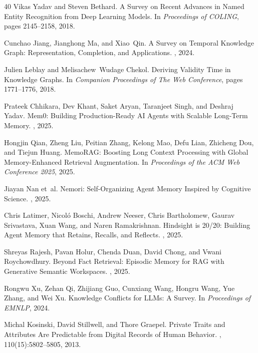 \documentclass[manuscript,review]{acmart}
\begin{document}
\begin{thebibliography}{40}
Vikas Yadav and Steven Bethard.
\newblock A Survey on Recent Advances in Named Entity Recognition from Deep Learning Models.
\newblock In {\em Proceedings of COLING}, pages 2145--2158, 2018.

Cunchao Jiang, Jianghong Ma, and Xiao~Qin.
\newblock A Survey on Temporal Knowledge Graph: Representation, Completion, and Applications.
, 2024.

Julien Leblay and Melisachew~Wudage Chekol.
\newblock Deriving Validity Time in Knowledge Graphs.
\newblock In {\em Companion Proceedings of The Web Conference}, pages 1771--1776, 2018.

Prateek Chhikara, Dev Khant, Saket Aryan, Taranjeet Singh, and Deshraj Yadav.
\newblock Mem0: Building Production-Ready AI Agents with Scalable Long-Term Memory.
, 2025.

Hongjin Qian, Zheng Liu, Peitian Zhang, Kelong Mao, Defu Lian, Zhicheng Dou, and Tiejun Huang.
\newblock MemoRAG: Boosting Long Context Processing with Global Memory-Enhanced Retrieval Augmentation.
\newblock In {\em Proceedings of the ACM Web Conference 2025}, 2025.

Jiayan Nan et~al.
\newblock Nemori: Self-Organizing Agent Memory Inspired by Cognitive Science.
, 2025.

Chris Latimer, Nicol{\'o} Boschi, Andrew Neeser, Chris Bartholomew, Gaurav Srivastava, Xuan Wang, and Naren Ramakrishnan.
\newblock Hindsight is 20/20: Building Agent Memory that Retains, Recalls, and Reflects.
, 2025.

Shreyas Rajesh, Pavan Holur, Chenda Duan, David Chong, and Vwani Roychowdhury.
\newblock Beyond Fact Retrieval: Episodic Memory for RAG with Generative Semantic Workspaces.
, 2025.

Rongwu Xu, Zehan Qi, Zhijiang Guo, Cunxiang Wang, Hongru Wang, Yue Zhang, and Wei Xu.
\newblock Knowledge Conflicts for LLMs: A Survey.
\newblock In {\em Proceedings of EMNLP}, 2024.

Michal Kosinski, David Stillwell, and Thore Graepel.
\newblock Private Traits and Attributes Are Predictable from Digital Records of Human Behavior.
, 110(15):5802--5805, 2013.


\end{thebibliography}
\end{document}
